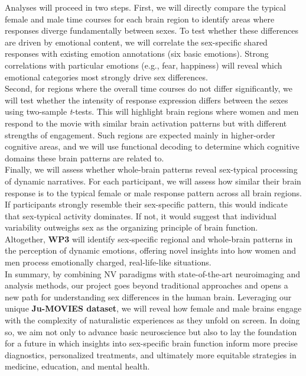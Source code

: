 \documentclass[11pt,a4paper]{article}
\begin{document}
Analyses will proceed in two steps. First, we will directly compare the typical female and male time courses
for each brain region to identify areas where responses diverge fundamentally between sexes. To test whether these 
differences are driven by emotional content, we will correlate the sex-specific shared responses with existing emotion annotations 
(six basic emotions). Strong correlations with particular emotions (e.g., fear, happiness) will reveal which emotional 
categories most strongly drive sex differences.\\
Second, for regions where the overall time courses do not differ significantly, we will test whether the intensity 
of response expression differs between the sexes using two-sample \textit{t}-tests. This will highlight brain regions where women and men 
respond to the movie with similar brain activation patterns but with different strengths of engagement. 
Such regions are expected mainly in higher-order cognitive areas, and we will use functional 
decoding \parencite{foxMetaanalysisHumanNeuroimaging2014a} to determine which cognitive domains these brain patterns are
related to.\\  
Finally, we will assess whether whole-brain patterns reveal sex-typical processing of dynamic narratives. 
For each participant, we will assess how similar their brain response is to the typical female or male response pattern 
across all brain regions. If participants strongly resemble their sex-specific pattern, this would indicate that 
sex-typical activity dominates. If not, it would suggest that individual variability outweighs sex as the organizing 
principle of brain function.\\
Altogether, \textbf{WP3} will identify sex-specific regional and whole-brain patterns in the perception of dynamic emotions, 
offering novel insights into how women and men process emotionally charged, real-life-like situations.\\  
[6pt]
In summary, by combining NV paradigms with state-of-the-art neuroimaging and analysis methods, our project goes beyond 
traditional approaches and opens a new path for understanding sex differences in the human brain. Leveraging our unique 
\textbf{Ju-MOVIES dataset}, we will reveal how female and male brains engage with the complexity of naturalistic 
experiences as they unfold on screen. In doing so, we aim not only to advance basic neuroscience but also to lay the 
foundation for a future in which insights into sex-specific brain function inform more precise diagnostics,
personalized treatments, and ultimately more equitable strategies in medicine, education, and mental health.
\end{document}
